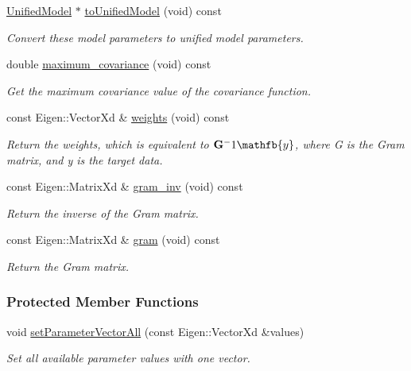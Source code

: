 \begin{DoxyCompactItemize}
\hyperlink{classDmpBbo_1_1UnifiedModel}{Unified\+Model} $\ast$ \hyperlink{classDmpBbo_1_1ModelParametersGPR_a6e3534f93333334c2f0126f8fc4d29d1}{to\+Unified\+Model} (void) const 
\begin{DoxyCompactList}\small\item\em Convert these model parameters to unified model parameters. \end{DoxyCompactList}\item 
double \hyperlink{classDmpBbo_1_1ModelParametersGPR_a298a9f1cca5f13135bb2b4334a56c734}{maximum\+\_\+covariance} (void) const 
\begin{DoxyCompactList}\small\item\em Get the maximum covariance value of the covariance function. \end{DoxyCompactList}\item 
const Eigen\+::\+Vector\+Xd \& \hyperlink{classDmpBbo_1_1ModelParametersGPR_ab0065893578a0770652450ebfe930481}{weights} (void) const 
\begin{DoxyCompactList}\small\item\em Return the weights, which is equivalent to $ \mathbf{G}^-1\mathfb{y} $, where G is the Gram matrix, and y is the target data. \end{DoxyCompactList}\item 
const Eigen\+::\+Matrix\+Xd \& \hyperlink{classDmpBbo_1_1ModelParametersGPR_a7f75d2b936b5f42a2cee13100b9a0386}{gram\+\_\+inv} (void) const 
\begin{DoxyCompactList}\small\item\em Return the inverse of the Gram matrix. \end{DoxyCompactList}\item 
const Eigen\+::\+Matrix\+Xd \& \hyperlink{classDmpBbo_1_1ModelParametersGPR_a9020e3c52d3e8b18d8d3caf675ae409e}{gram} (void) const 
\begin{DoxyCompactList}\small\item\em Return the Gram matrix. \end{DoxyCompactList}\end{DoxyCompactItemize}
\subsubsection*{Protected Member Functions}
\begin{DoxyCompactItemize}
\item 
void \hyperlink{classDmpBbo_1_1ModelParametersGPR_a9d3c8f22e8237a805af4935a647e5a50}{set\+Parameter\+Vector\+All} (const Eigen\+::\+Vector\+Xd \&values)
\begin{DoxyCompactList}\small\item\em Set all available parameter values with one vector. \end{DoxyCompactList}\end{DoxyCompactItemize}
